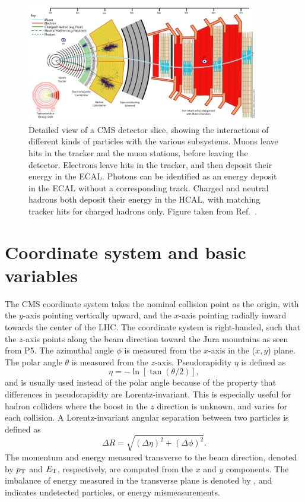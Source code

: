 \begin{figure}[htpb]
  \centering
  \includegraphics[width=0.9\textwidth]{figures/cms/CMS_Slice}
  \caption{Detailed view of a CMS detector slice, showing the interactions of different kinds of
particles with the various subsystems. Muons leave hits in the tracker and the muon stations,
before leaving the detector. Electrons leave hits in the tracker, and then deposit their
energy in the ECAL. Photons can be identified as an energy deposit in the ECAL without a
corresponding track. Charged and neutral hadrons both deposit their energy in the HCAL, with
matching tracker hits for charged hadrons only. 
Figure taken from Ref.~\cite{CMS_slice}.
  \label{fig:cms_slice}}
\end{figure}

\section{Coordinate system and basic variables \label{sec:cms_coordinates}}

The CMS coordinate system takes the nominal collision point as the origin, with the $y$-axis
pointing vertically upward, and the $x$-axis pointing radially inward towards the center of the
LHC. The coordinate system is right-handed, such that the $z$-axis points along the beam direction
toward the Jura mountains as seen from P5. 
The azimuthal angle $\phi$ is measured from the $x$-axis in the ($x,y$) plane. The polar angle
$\theta$ is measured from the $z$-axis. 
Pseudorapidity $\eta$ is defined as 
\begin{equation}
 \eta = - \ln \left[ \tan(\theta/2) \right],  
\end{equation}
and is usually used instead of the
polar angle because of the property that differences in pseudorapidity are
Lorentz-invariant. This is especially useful for hadron colliders where the boost in the $z$
direction is unknown, and varies for each collision. A Lorentz-invariant angular separation between
two particles is defined as 
\begin{equation}
\Delta R = \sqrt{(\Delta\eta)^2 + (\Delta\phi)^2}.
\end{equation}
The momentum and energy measured transverse to the beam direction, denoted by $p_{\mathrm{T}}$ and $E_{\mathrm{T}}$,
respectively, are computed from the $x$ and $y$ components.
The imbalance of energy measured in the transverse plane is denoted by \ETm, and indicates
undetected particles, or energy mismeasurements.
 

